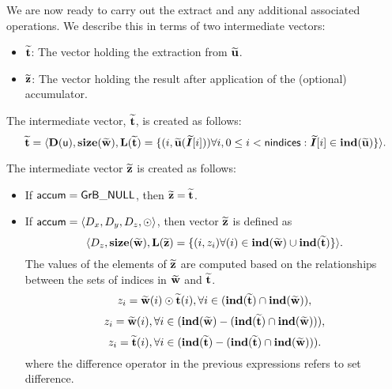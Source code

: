 We are now ready to carry out the extract and any additional 
associated operations.  We describe this in terms of two intermediate vectors:
\begin{itemize}
	\item ${\bf \widetilde{t}}$: The vector holding the extraction from
    ${\bf \widetilde{u}}$.
	\item ${\bf \widetilde{z}}$: The vector holding the result after 
    application of the (optional) accumulator.
\end{itemize}

The intermediate vector, ${\bf \widetilde{t}}$, is created as follows:
\[ {\bf \widetilde{t}} = \langle
\bold{D}({\sf u}), \bold{size}({\bf \widetilde{w}}),
\bold{L}({\bf \widetilde{t}}) =
\{(i,{\bf \widetilde{u}}(\bm{\widetilde{I}}[i])) \forall i, 0 \leq i < {\sf nindices} : 
\bm{\widetilde{I}}[i] \in \bold{ind}({\bf \widetilde{u}}) \} \rangle. \]

The intermediate vector ${\bf \widetilde{z}}$ is created as follows:
\begin{itemize}
    \item If ${\sf accum} = {\sf GrB\_NULL}$, then ${\bf \widetilde{z}} = {\bf \widetilde{t}}$.

    \item If ${\sf accum} = \langle D_x, D_y, D_z, \odot \rangle$, then vector ${\bf \widetilde{z}}$ is defined as 
        \[ \langle D_z, \bold{size}({\bf \widetilde{w}}), \bold{L}({\bf \widetilde{z}})
		= \{(i,z_{i})  \forall (i) \in \bold{ind}({\bf \widetilde{w}}) \cup 
        \bold{ind}({\bf \widetilde{t}}) \} \rangle.\]
    The values of the elements of ${\bf \widetilde{z}}$ are computed based on the relationships between the sets of indices in ${\bf \widetilde{w}}$ and ${\bf \widetilde{t}}$.
\[
z_{i} = {\bf \widetilde{w}}(i) \odot {\bf \widetilde{t}}(i), \forall i \in  (\bold{ind}({\bf \widetilde{t}}) \cap \bold{ind}({\bf \widetilde{w}})),
\]
\[
z_{i} = {\bf \widetilde{w}}(i), \forall  i \in  (\bold{ind}({\bf \widetilde{w}}) - (\bold{ind}({\bf \widetilde{t}}) \cap \bold{ind}({\bf \widetilde{w}}))),
\]
\[
z_{i} = {\bf \widetilde{t}}(i), \forall  i \in  (\bold{ind}({\bf \widetilde{t}}) - (\bold{ind}({\bf \widetilde{t}}) \cap \bold{ind}({\bf \widetilde{w}}))).
\]
where the difference operator in the previous expressions refers to set difference.
\end{itemize}

